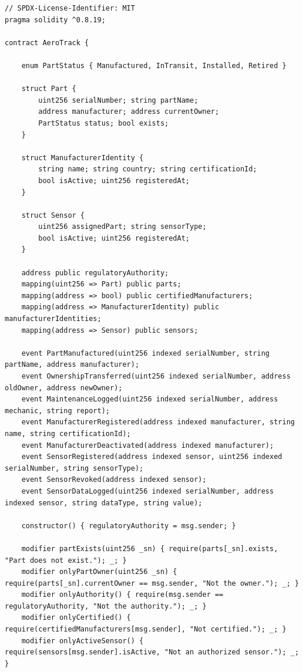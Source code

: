 \documentclass[12pt,a4paper]{article}
\begin{document}
\begin{lstlisting}[caption={Step7\_IoTOracle.sol -- Adds IoT sensor system}]
// SPDX-License-Identifier: MIT
pragma solidity ^0.8.19;

contract AeroTrack {

    enum PartStatus { Manufactured, InTransit, Installed, Retired }

    struct Part {
        uint256 serialNumber; string partName;
        address manufacturer; address currentOwner;
        PartStatus status; bool exists;
    }

    struct ManufacturerIdentity {
        string name; string country; string certificationId;
        bool isActive; uint256 registeredAt;
    }

    struct Sensor {
        uint256 assignedPart; string sensorType;
        bool isActive; uint256 registeredAt;
    }

    address public regulatoryAuthority;
    mapping(uint256 => Part) public parts;
    mapping(address => bool) public certifiedManufacturers;
    mapping(address => ManufacturerIdentity) public manufacturerIdentities;
    mapping(address => Sensor) public sensors;

    event PartManufactured(uint256 indexed serialNumber, string partName, address manufacturer);
    event OwnershipTransferred(uint256 indexed serialNumber, address oldOwner, address newOwner);
    event MaintenanceLogged(uint256 indexed serialNumber, address mechanic, string report);
    event ManufacturerRegistered(address indexed manufacturer, string name, string certificationId);
    event ManufacturerDeactivated(address indexed manufacturer);
    event SensorRegistered(address indexed sensor, uint256 indexed serialNumber, string sensorType);
    event SensorRevoked(address indexed sensor);
    event SensorDataLogged(uint256 indexed serialNumber, address indexed sensor, string dataType, string value);

    constructor() { regulatoryAuthority = msg.sender; }

    modifier partExists(uint256 _sn) { require(parts[_sn].exists, "Part does not exist."); _; }
    modifier onlyPartOwner(uint256 _sn) { require(parts[_sn].currentOwner == msg.sender, "Not the owner."); _; }
    modifier onlyAuthority() { require(msg.sender == regulatoryAuthority, "Not the authority."); _; }
    modifier onlyCertified() { require(certifiedManufacturers[msg.sender], "Not certified."); _; }
    modifier onlyActiveSensor() { require(sensors[msg.sender].isActive, "Not an authorized sensor."); _; }


\end{lstlisting}
\end{document}
